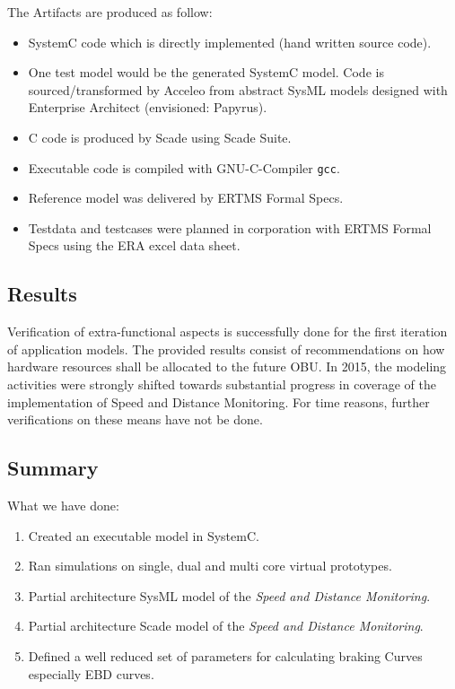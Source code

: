The Artifacts are produced as follow:
\begin{itemize}
\item SystemC code which is directly implemented (hand written source code).
\item One test model would be the generated SystemC model. Code is sourced/transformed by Acceleo from abstract SysML models designed with Enterprise Architect (envisioned: Papyrus).
\item C code is produced by Scade using Scade Suite.
\item Executable code is compiled with GNU-C-Compiler \texttt{gcc}.
\item Reference model was delivered by ERTMS Formal Specs.
\item Testdata and testcases were planned in corporation with ERTMS Formal Specs using the ERA excel data sheet.
\end{itemize}

\subsection{Results}

Verification of extra-functional aspects is successfully done for the first iteration of application models. The provided results consist of recommendations on how hardware resources shall be allocated to the future OBU. In 2015, the modeling activities were strongly shifted towards substantial progress in coverage of the implementation of Speed and Distance Monitoring. For time reasons, further verifications on these means have not be done.

\subsection{Summary}

What we have done:
\begin{enumerate}
\item Created an executable model in SystemC.
\item Ran simulations on single, dual and multi core virtual prototypes.
\item Partial architecture SysML model of the \emph{Speed and Distance Monitoring}.
\item Partial architecture Scade model of the \emph{Speed and Distance Monitoring}.
\item Defined a well reduced set of parameters for calculating braking Curves especially EBD curves.
\end{enumerate}
 

